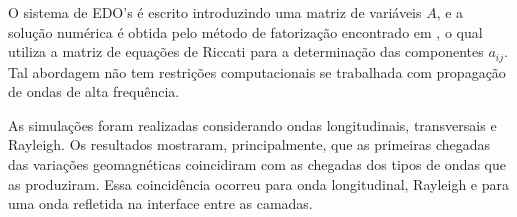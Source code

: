 O sistema de EDO's \'e escrito introduzindo uma matriz de vari\'aveis $A$, e a solu\c{c}\~ao num\'erica \'e obtida pelo m\'etodo de fatoriza\c{c}\~ao encontrado em \cite{Mikhailenko_89}, o qual utiliza a matriz de equa\c{c}\~oes de Riccati para a determina\c{c}\~ao das componentes $a_{ij}$. Tal abordagem n\~ao tem restri\c{c}\~oes computacionais se trabalhada com propaga\c{c}\~ao de ondas de alta frequ\^encia.

As simula\c{c}\~oes foram realizadas considerando ondas longitudinais, transversais e Rayleigh. Os resultados  mostraram, principalmente, que as primeiras chegadas das varia\c{c}\~oes geomagn\'eticas coincidiram com as chegadas dos tipos de ondas que as produziram. Essa coincid\^encia ocorreu para onda longitudinal, Rayleigh e para uma onda refletida na interface entre as camadas.
